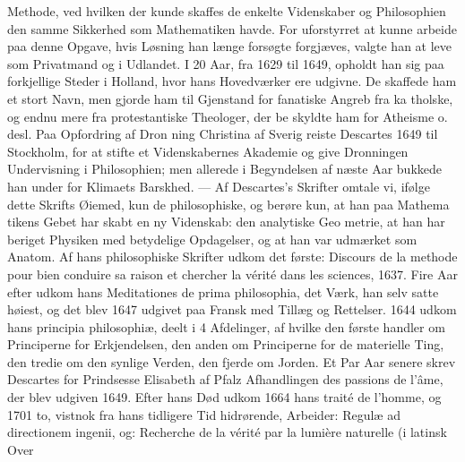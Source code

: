 \documentclass[12pt,a4paper]{book}
\begin{document}
Methode, ved hvilken der kunde skaffes de enkelte Videnskaber
og Philosophien den samme Sikkerhed som Mathematiken
havde. For uforstyrret at kunne arbeide paa denne Opgave,
hvis Løsning han længe forsøgte forgjæves, valgte han at leve
som Privatmand og i Udlandet. I 20 Aar, fra 1629 til 1649,
opholdt han sig paa forkjellige Steder i Holland, hvor hans
Hovedværker ere udgivne. De skaffede ham et stort Navn,
men gjorde ham til Gjenstand for fanatiske Angreb fra ka\-%
tholske, og endnu mere fra protestantiske Theologer, der be\-%
skyldte ham for Atheisme o. desl. Paa Opfordring af Dron\-%
ning Christina af Sverig reiste Descartes 1649 til Stockholm,
for at stifte et Videnskabernes Akademie og give Dronningen
Undervisning i Philosophien; men allerede i Begyndelsen af
næste Aar bukkede han under for Klimaets Barskhed. ---
Af Descartes's Skrifter omtale vi, ifølge dette Skrifts Øiemed,
kun de philosophiske, og berøre kun, at han paa Mathema\-%
tikens Gebet har skabt en ny Videnskab: den analytiske Geo\-%
metrie, at han har beriget Physiken med betydelige Opdagelser,
og at han var udmærket som Anatom. Af hans philosophiske
Skrifter udkom det første: Discours de la methode pour bien
conduire sa raison et chercher la vérité dans les sciences, 1637.
Fire Aar efter udkom hans Meditationes de prima philosophia,
det Værk, han selv satte høiest, og det blev 1647 udgivet paa
Fransk med Tillæg og Rettelser. 1644 udkom hans principia
philosophiæ, deelt i 4 Afdelinger, af hvilke den første handler
om Principerne for Erkjendelsen, den anden om Principerne
for de materielle Ting, den tredie om den synlige Verden, den
fjerde om Jorden. Et Par Aar senere skrev Descartes for
Prindsesse Elisabeth af Pfalz Afhandlingen des passions de
l'âme, der blev udgiven 1649. Efter hans Død udkom 1664
hans traité de l'homme, og 1701 to, vistnok fra hans tidligere
Tid hidrørende, Arbeider: Regulæ ad directionem ingenii, og:
Recherche de la vérité par la lumière naturelle (i latinsk Over\-%
\end{document}
